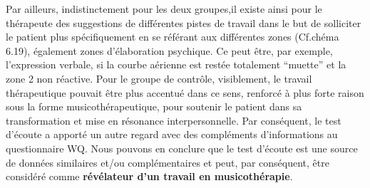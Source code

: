  Par ailleurs, indistinctement pour les deux
 groupes,il existe ainsi pour le thérapeute des
 suggestions de différentes pistes de travail dans le but de 
 solliciter le patient plus spécifiquement en se référant aux
              différentes zones (Cf.chéma 6.19), également zones
 d'élaboration psychique. Ce peut être, par exemple,
              l'expression verbale, si la courbe aérienne est restée
              totalement ``muette'' et la zone 2 non
              réactive. Pour le groupe de contrôle, visiblement, le travail
                thérapeutique pouvait être plus accentué dans ce
                sens, renforcé à plus forte raison sous la forme musicothérapeutique, pour soutenir le
                patient dans sa transformation et mise en résonance
                interpersonnelle.
                Par conséquent,  le test d'écoute a
                apporté un autre regard avec des compléments d'informations au questionnaire
                WQ.
               Nous pouvons en conclure que le test
                d'écoute est une source de données similaires
                et/ou complémentaires et peut, par conséquent, être
                considéré comme \textbf{révélateur d'un
                travail en musicothérapie}.




              

